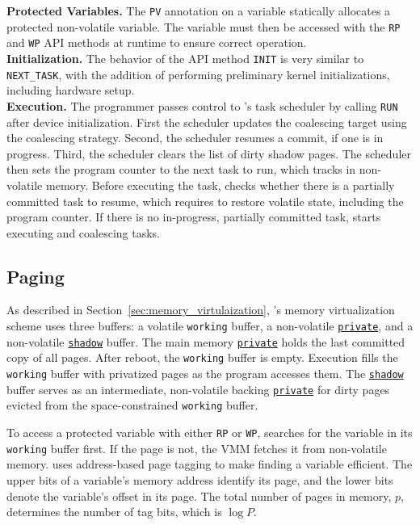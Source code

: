 %
\noindent\textbf{Protected Variables.} The \texttt{PV} annotation on a
variable statically allocates a protected non-volatile variable. The
variable must then be accessed with the \texttt{RP} and \texttt{WP} API methods at
runtime to ensure correct operation.\\
%
\noindent\textbf{Initialization.} The behavior of the API method
\texttt{INIT} is very similar to \texttt{NEXT\_TASK}, with the
addition of performing preliminary kernel initializations, including hardware setup.\\
%
\noindent\textbf{Execution.} The programmer passes control to \sys's task scheduler 
by calling \texttt{RUN} after device initialization. 
%
First the scheduler updates the coalescing target using the coalescing
strategy.  Second, the scheduler resumes a commit, if one is in progress. Third,
the scheduler clears the list of dirty shadow pages. The scheduler then 
sets the program counter to the next task to run, which \sys tracks in  
non-volatile memory.  
%
Before executing the task, \sys checks whether there is a partially committed
task to resume, which requires \sys to restore volatile state, including the program
counter.  
%
If there is no in-progress, partially committed task, \sys starts executing and
coalescing tasks. 


\subsection{Paging}
\label{sec:impl:paging}

As described in Section~\ref{sec:memory_virtulaization}, \sys's memory
virtualization scheme uses three buffers: a volatile \texttt{working} buffer, a
non-volatile \texttt{\underline{private}}, and a non-volatile
\texttt{\underline{shadow}} buffer. 
%
The main memory \texttt{\underline{private}} holds the last committed copy of all 
pages. 
%
After reboot, the \texttt{working} buffer is empty. Execution fills 
the \texttt{working} buffer with privatized pages as the program accesses them. 
%
The \texttt{\underline{shadow}} buffer serves as an intermediate,
non-volatile backing \texttt{\underline{private}} for dirty pages evicted from the space-constrained
\texttt{working} buffer. 

To access a protected variable with either \texttt{RP}
or \texttt{WP}, \sys searches for the variable in its \texttt{working} buffer first.
 If the page is not, the VMM fetches it from non-volatile memory. 
%
\sys uses address-based page tagging to make finding a variable efficient.  The
upper bits of a variable's memory address identify its page, and the lower bits
denote the variable's offset in its page. The total number of pages in memory,
$p$, determines the number of tag bits, which is $\log P$.

